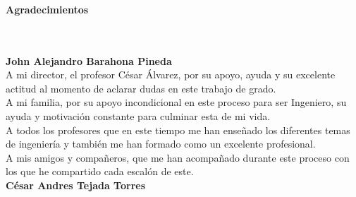 \newpage{\pagestyle{empty}\cleardoublepage}

\newpage
\thispagestyle{empty} \textbf{}\normalsize
\\\\\\%
\textbf{\LARGE Agradecimientos}
\\\\

\textbf{John Alejandro Barahona Pineda}\\

A mi director, el profesor César Álvarez, por su apoyo, ayuda y su excelente actitud al momento de aclarar dudas en este trabajo de grado.\\

A mi familia, por su apoyo incondicional en este proceso para ser Ingeniero, su ayuda y motivación constante para culminar esta de mi vida.\\

A todos los profesores que en este tiempo me han enseñado los diferentes temas de ingeniería y también me han formado como un excelente profesional.\\

A mis amigos y compañeros, que me han acompañado durante este proceso con los que he compartido cada escalón de este.\\ 

\textbf{César Andres Tejada Torres}\\

\newpage{\pagestyle{empty}\cleardoublepage}